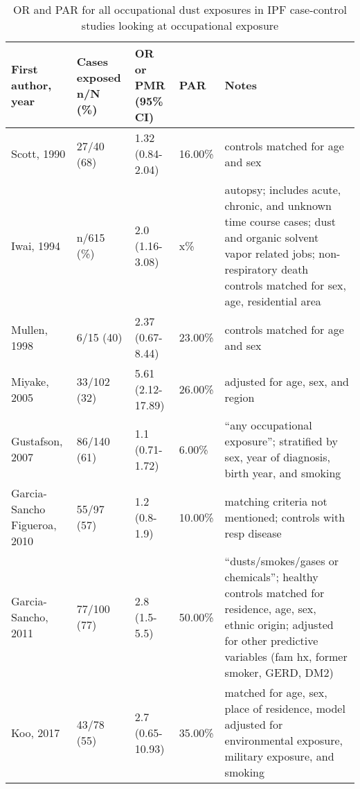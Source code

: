 \documentclass[a4
er,12pt]{article}
\begin{document}
\begin{table}   
     \begin{tabular}{p{3.5cm}p{3cm}p{2cm}p{2cm}p{3.5cm}}
     \textbf{First author, year} & \textbf{Cases exposed n/N (\%)} & \textbf{OR or PMR (95\% CI)} & \textbf{PAR} &   \textbf{Notes} \\
     \midrule
   Scott, 1990 &  27/40 (68) &  1.32 (0.84-2.04) &  16.00\% &  controls matched for age and sex \\
 Iwai, 1994 &  n/615 (\%) &  2.0 (1.16-3.08) &  x\% &  autopsy; includes acute, chronic, and unknown time course cases; dust and organic solvent vapor related jobs; non-respiratory death controls matched for sex, age, residential area \\
 Mullen, 1998 &  6/15 (40) &  2.37 (0.67-8.44) &  23.00\% &  controls matched for age and sex \\
 Miyake, 2005 &  33/102 (32) &  5.61 (2.12-17.89) &  26.00\% &  adjusted for age, sex, and region \\
 Gustafson, 2007 &  86/140 (61) &  1.1 (0.71-1.72) &  6.00\% &  “any occupational exposure”; stratified by sex, year of diagnosis, birth year, and smoking \\
 Garcia-Sancho Figueroa, 2010 &  55/97 (57) &  1.2 (0.8-1.9) &  10.00\% &  matching criteria not mentioned; controls with resp disease \\
 Garcia-Sancho, 2011 &  77/100 (77) &  2.8 (1.5-5.5) &  50.00\% &  “dusts/smokes/gases or chemicals”; healthy controls matched for residence, age, sex, ethnic origin; adjusted for other predictive variables (fam hx, former smoker, GERD, DM2) \\
 Koo, 2017 &  43/78 (55) &  2.7 (0.65-10.93) &  35.00\% &  matched for age, sex, place of residence, model adjusted for environmental exposure, military exposure, and smoking \\
     \bottomrule
     \end{tabular}                 
     \caption{OR and PAR for all occupational dust exposures in IPF case-control studies looking at occupational exposure}
     \label{table:ipfalldust}
 \end{table}
\end{document}

